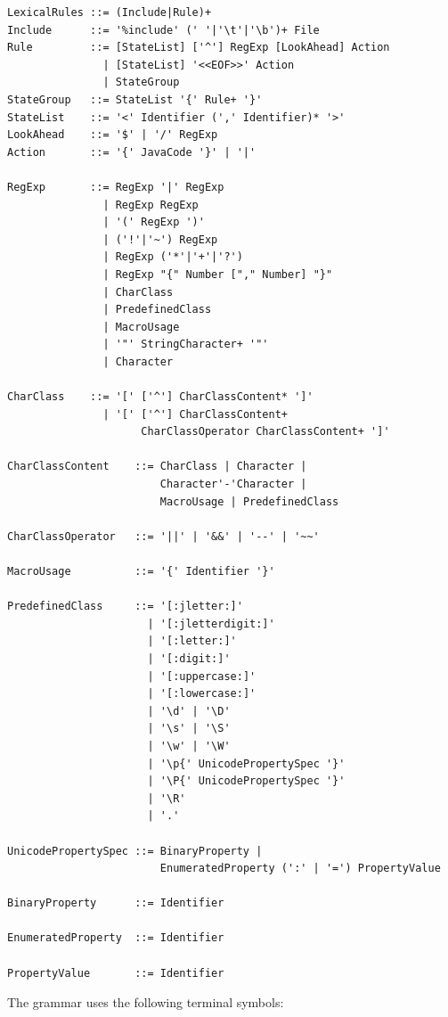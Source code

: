 \begin{verbatim}
LexicalRules ::= (Include|Rule)+
Include      ::= '%include' (' '|'\t'|'\b')+ File
Rule         ::= [StateList] ['^'] RegExp [LookAhead] Action 
               | [StateList] '<<EOF>>' Action
               | StateGroup 
StateGroup   ::= StateList '{' Rule+ '}' 
StateList    ::= '<' Identifier (',' Identifier)* '>' 
LookAhead    ::= '$' | '/' RegExp
Action       ::= '{' JavaCode '}' | '|'

RegExp       ::= RegExp '|' RegExp 
               | RegExp RegExp 
               | '(' RegExp ')'
               | ('!'|'~') RegExp
               | RegExp ('*'|'+'|'?')
               | RegExp "{" Number ["," Number] "}" 
               | CharClass
               | PredefinedClass 
               | MacroUsage 
               | '"' StringCharacter+ '"' 
               | Character 

CharClass    ::= '[' ['^'] CharClassContent* ']'
               | '[' ['^'] CharClassContent+ 
                     CharClassOperator CharClassContent+ ']'
                 
CharClassContent    ::= CharClass | Character |
                        Character'-'Character | 
                        MacroUsage | PredefinedClass

CharClassOperator   ::= '||' | '&&' | '--' | '~~'

MacroUsage          ::= '{' Identifier '}'

PredefinedClass     ::= '[:jletter:]' 
                      | '[:jletterdigit:]' 
                      | '[:letter:]' 
                      | '[:digit:]'
                      | '[:uppercase:]' 
                      | '[:lowercase:]'
                      | '\d' | '\D'
                      | '\s' | '\S'
                      | '\w' | '\W'
                      | '\p{' UnicodePropertySpec '}'
                      | '\P{' UnicodePropertySpec '}'
                      | '\R'
                      | '.'          
                            
UnicodePropertySpec ::= BinaryProperty | 
                        EnumeratedProperty (':' | '=') PropertyValue

BinaryProperty      ::= Identifier

EnumeratedProperty  ::= Identifier

PropertyValue       ::= Identifier
\end{verbatim}

The grammar uses the following terminal symbols:

